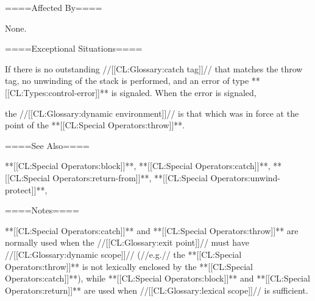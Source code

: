 ====Affected By====

None.

====Exceptional Situations====

If there is no outstanding //[[CL:Glossary:catch tag]]// that matches the throw tag, no unwinding of the stack is performed, and an error of type **[[CL:Types:control-error]]** is signaled. When the error is signaled,

the //[[CL:Glossary:dynamic environment]]// is that which was in force at the point of the **[[CL:Special Operators:throw]]**.

====See Also====

**[[CL:Special Operators:block]]**, **[[CL:Special Operators:catch]]**, **[[CL:Special Operators:return-from]]**, **[[CL:Special Operators:unwind-protect]]**, {\secref\Evaluation}

====Notes====

**[[CL:Special Operators:catch]]** and **[[CL:Special Operators:throw]]** are normally used when the //[[CL:Glossary:exit point]]// must have //[[CL:Glossary:dynamic scope]]// (//e.g.// the **[[CL:Special Operators:throw]]** is not lexically enclosed by the **[[CL:Special Operators:catch]]**), while **[[CL:Special Operators:block]]** and **[[CL:Special Operators:return]]** are used when //[[CL:Glossary:lexical scope]]// is sufficient.

